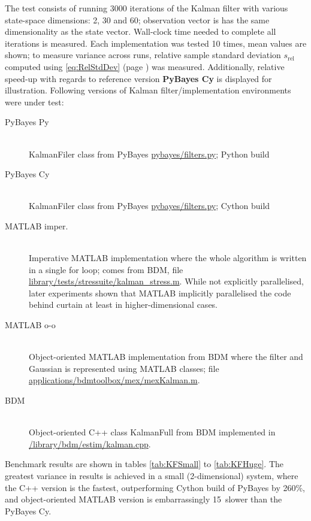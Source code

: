 The test consists of running 3000 iterations of the Kalman filter with various state-space dimensions:
2, 30 and 60; observation vector is has the same dimensionality as the state vector. Wall-clock time
needed to complete all iterations is measured. Each implementation was tested 10 times, mean values
are shown; to measure variance across runs, relative sample standard deviation \(s_{\text{rel}}\)
computed using \eqref{eq:RelStdDev} (page \pageref{eq:RelStdDev}) was measured. Additionally,
relative speed-up with regards to reference version \textbf{PyBayes Cy} is displayed for
illustration. Following versions of Kalman filter/implementation environments were under test:
\begin{description}
	\item[PyBayes Py] \hfill \\
		KalmanFiler class from PyBayes \url{pybayes/filters.py}; Python build
	\item[PyBayes Cy] \hfill \\
		KalmanFiler class from PyBayes \url{pybayes/filters.py}; Cython build
	\item[MATLAB imper.] \hfill \\
		Imperative MATLAB implementation where the whole algorithm is written
		in a single for loop; comes from BDM, file \url{library/tests/stressuite/kalman_stress.m}.
		While not explicitly parallelised, later experiments shown that MATLAB implicitly
		parallelised the code behind curtain at least in higher-dimensional cases.
	\item[MATLAB o-o] \hfill \\
		Object-oriented MATLAB implementation from BDM where the filter and Gaussian {\pdf} is
		represented using MATLAB classes; file \url{applications/bdmtoolbox/mex/mexKalman.m}.
	\item[BDM] \hfill \\
		 Object-oriented C++ class KalmanFull from BDM implemented in
		 \url{/library/bdm/estim/kalman.cpp}.
\end{description}
Benchmark results are shown in tables \ref{tab:KFSmall} to \ref{tab:KFHuge}. The greatest variance
in results is achieved in a small (2-dimensional) system, where the C++ version is the fastest,
outperforming Cython build of PyBayes by 260\%, and object-oriented MATLAB version is embarrassingly
15\x\ slower than the PyBayes Cy.

